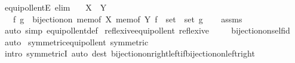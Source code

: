 \begin{isabellebody}
\endisatagproof
{\isafoldproof}%
%
\isadelimproof
\isanewline
%
\endisadelimproof
\isanewline
{}\isamarkupfalse%
\ equipollentE\ {\isacharbrackleft}{\kern0pt}elim{\isacharbrackright}{\kern0pt}{\isacharcolon}{\kern0pt}\isanewline
\ \ \ {\isachardoublequoteopen}X\ {\isasymapprox}\ Y{\isachardoublequoteclose}\isanewline
\ \ \ f\ g\ \ {\isachardoublequoteopen}bijection{\isacharunderscore}{\kern0pt}on\ {\isacharparenleft}{\kern0pt}mem{\isacharunderscore}{\kern0pt}of\ X{\isacharparenright}{\kern0pt}\ {\isacharparenleft}{\kern0pt}mem{\isacharunderscore}{\kern0pt}of\ Y{\isacharparenright}{\kern0pt}\ {\isacharparenleft}{\kern0pt}f\ {\isacharcolon}{\kern0pt}{\isacharcolon}{\kern0pt}\ set\ {\isasymRightarrow}\ set{\isacharparenright}{\kern0pt}\ g{\isachardoublequoteclose}\isanewline
%
\isadelimproof
\ \ %
\endisadelimproof
%
\isatagproof
{}\isamarkupfalse%
\ assms\ \isamarkupfalse%
\ {\isacharparenleft}{\kern0pt}auto\ simp{\isacharcolon}{\kern0pt}\ equipollent{\isacharunderscore}{\kern0pt}def{\isacharparenright}{\kern0pt}%
\endisatagproof
{\isafoldproof}%
%
\isadelimproof
\isanewline
%
\endisadelimproof
\isanewline
{}\isamarkupfalse%
\ reflexive{\isacharunderscore}{\kern0pt}equipollent{\isacharcolon}{\kern0pt}\ {\isachardoublequoteopen}reflexive\ {\isacharparenleft}{\kern0pt}{\isasymapprox}{\isacharparenright}{\kern0pt}{\isachardoublequoteclose}\isanewline
%
\isadelimproof
\ \ %
\endisadelimproof
%
\isatagproof
{}\isamarkupfalse%
\ bijection{\isacharunderscore}{\kern0pt}on{\isacharunderscore}{\kern0pt}self{\isacharunderscore}{\kern0pt}id\ \isamarkupfalse%
\ auto%
\endisatagproof
{\isafoldproof}%
%
\isadelimproof
\isanewline
%
\endisadelimproof
\isanewline
{}\isamarkupfalse%
\ symmetric{\isacharunderscore}{\kern0pt}equipollent{\isacharcolon}{\kern0pt}\ {\isachardoublequoteopen}symmetric\ {\isacharparenleft}{\kern0pt}{\isasymapprox}{\isacharparenright}{\kern0pt}{\isachardoublequoteclose}\isanewline
%
\isadelimproof
\ \ %
\endisadelimproof
%
\isatagproof
{}\isamarkupfalse%
\ {\isacharparenleft}{\kern0pt}intro\ symmetricI{\isacharparenright}{\kern0pt}\ {\isacharparenleft}{\kern0pt}auto\ dest{\isacharcolon}{\kern0pt}\ bijection{\isacharunderscore}{\kern0pt}on{\isacharunderscore}{\kern0pt}right{\isacharunderscore}{\kern0pt}left{\isacharunderscore}{\kern0pt}if{\isacharunderscore}{\kern0pt}bijection{\isacharunderscore}{\kern0pt}on{\isacharunderscore}{\kern0pt}left{\isacharunderscore}{\kern0pt}right{\isacharparenright}{\kern0pt}%

\end{isabellebody}
